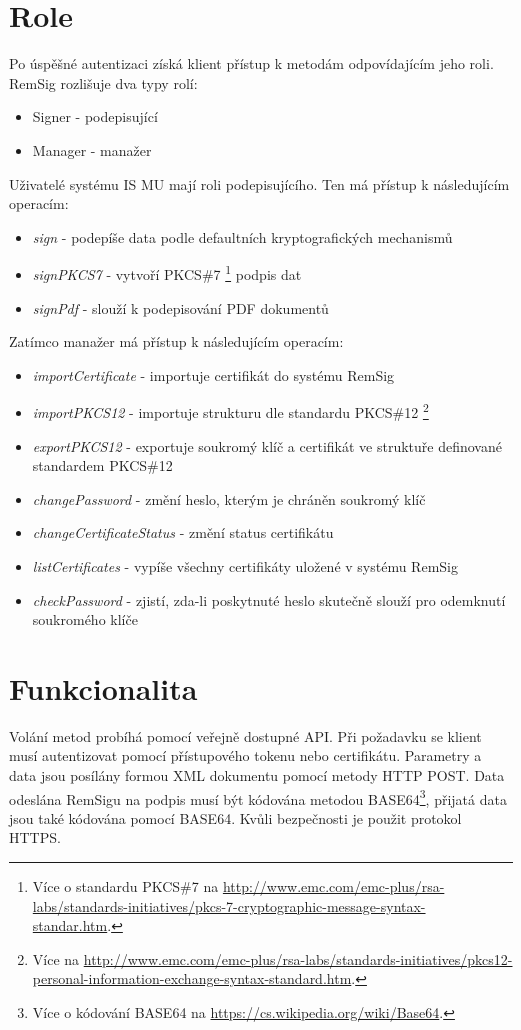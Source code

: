 \documentclass[]{fithesis3}
\begin{document}
	\section{Role} 	
	Po úspěšné autentizaci získá klient přístup k metodám odpovídajícím jeho roli. RemSig rozlišuje 		dva typy rolí:
	\begin{itemize}
		\item Signer - podepisující
		\item Manager - manažer
	\end{itemize}
	\newpage
	Uživatelé systému IS MU mají roli podepisujícího. Ten má přístup k následujícím operacím:
	\begin{itemize}
		\item \textit{sign} - podepíše data podle defaultních kryptografických mechanismů
		\item \textit{signPKCS7} - vytvoří PKCS\#7
			\footnote{Více o standardu PKCS\#7 na \url{http://www.emc.com/emc-plus/rsa-labs/standards-initiatives/pkcs-7-cryptographic-message-syntax-standar.htm}.} podpis dat
		\item \textit{signPdf} - slouží k podepisování PDF dokumentů
	\end{itemize}
	Zatímco manažer má přístup k následujícím operacím:
	\begin{itemize}
		\item \textit{importCertificate} - importuje certifikát do systému RemSig
		\item \textit{importPKCS12} - importuje strukturu dle standardu PKCS\#12
		\footnote{Více na \url{http://www.emc.com/emc-plus/rsa-labs/standards-initiatives/pkcs12-personal-information-exchange-syntax-standard.htm}.}
		\item \textit{exportPKCS12} - exportuje soukromý klíč a certifikát ve struktuře 					definované standardem PKCS\#12
		\item \textit{changePassword} - změní heslo, kterým je chráněn soukromý klíč
		\item \textit{changeCertificateStatus} - změní status certifikátu
		\item \textit{listCertificates} - vypíše všechny certifikáty uložené v systému RemSig
		\item \textit{checkPassword} - zjistí, zda-li poskytnuté heslo skutečně slouží pro 					odemknutí soukromého klíče
	\end{itemize}

	\section{Funkcionalita}
	Volání metod probíhá pomocí veřejně dostupné API. Při požadavku se klient musí autentizovat 		pomocí přístupového tokenu nebo certifikátu. Parametry a data jsou posílány formou XML 			dokumentu pomocí metody HTTP POST. Data odeslána RemSigu na podpis musí být 				kódována metodou BASE64\footnote{Více o kódování BASE64 na \url{https://cs.wikipedia.org/wiki/Base64}.}, přijatá 		data jsou také kódována pomocí BASE64. Kvůli 	bezpečnosti je použit protokol HTTPS.
\end{document}
